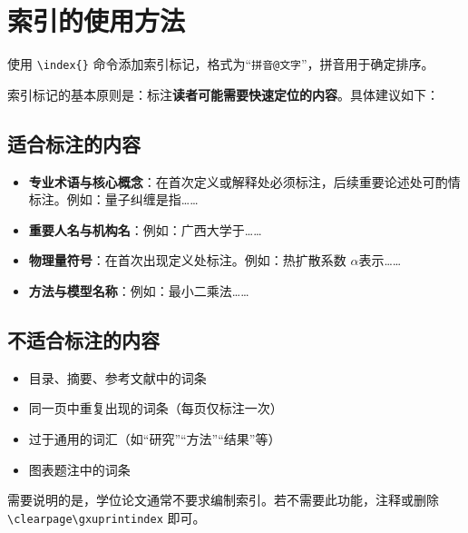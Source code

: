 \section{索引的使用方法}

使用 \verb|\index{}| 命令添加索引标记，格式为“\verb|拼音@文字|”，拼音用于确定排序。

索引标记的基本原则是：标注\textbf{读者可能需要快速定位的内容}。具体建议如下：

\subsection{适合标注的内容}

\begin{itemize}
    \item \textbf{专业术语与核心概念}：在首次定义或解释处必须标注，后续重要论述处可酌情标注。例如：量子纠缠是指……
    \item \textbf{重要人名与机构名}：例如：广西大学于……
    \item \textbf{物理量符号}：在首次出现定义处标注。例如：热扩散系数 $\alpha$表示……
    \item \textbf{方法与模型名称}：例如：最小二乘法……
\end{itemize}

\subsection{不适合标注的内容}

\begin{itemize}
    \item 目录、摘要、参考文献中的词条
    \item 同一页中重复出现的词条（每页仅标注一次）
    \item 过于通用的词汇（如“研究”“方法”“结果”等）
    \item 图表题注中的词条
\end{itemize}

需要说明的是，学位论文通常不要求编制索引。若不需要此功能，注释或删除 \verb|\clearpage\gxuprintindex| 即可。